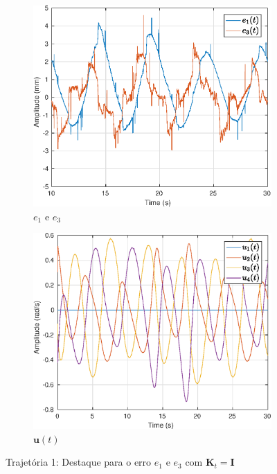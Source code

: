 \begin{figure}[H]
\centering
\begin{subfigure}{.5\textwidth}
  \centering
  \includegraphics[width=\linewidth]{./img/traj_1_k1/error.eps}
  \caption{$e_1$ e $e_3$}
  \label{fig:sub1}
\end{subfigure}%
\begin{subfigure}{.5\textwidth}
  \centering
  \includegraphics[width=\linewidth]{./img/traj_1_k1/u.eps}
  \caption{$\bm{u}(t)$}
  \label{fig:sub2}
\end{subfigure}
\caption{Trajetória 1: Destaque para o erro $e_1$ e $e_3$ com $\bm{K}_t = \bm{I}$}
\label{fig:erro_traj}
\end{figure}

